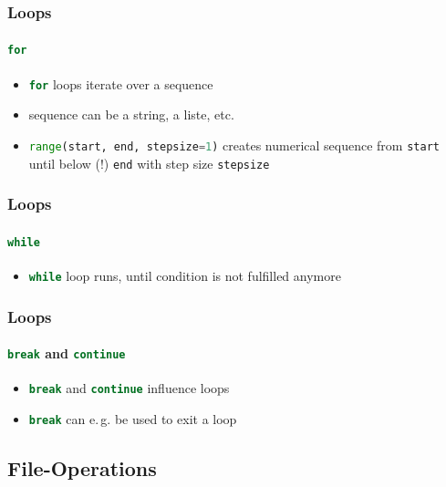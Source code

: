 \documentclass[english]{beamer}
\newcommand{\ta}[1]{\textattachfile[color=1 0 0]{#1}{Code}}
\begin{document}
\begin{frame}[containsverbatim]
\frametitle{Loops}
\framesubtitle{\lstinline[language={Python}]{for}}

\begin{itemize}
\item \lstinline[language={Python}]{for} loops iterate over a sequence
\item sequence can be a string, a liste, etc. 
\item \lstinline[language={Python}]{range(start, end, stepsize=1)} creates numerical sequence from \texttt{start} until below (!) \texttt{end} with step size \texttt{stepsize}
\end{itemize}



\end{frame}


\begin{frame}[containsverbatim]
\frametitle{Loops}
\framesubtitle{\lstinline[language={Python}]{while}}

\begin{itemize}
\item \lstinline[language={Python}]{while} loop runs, until condition is not fulfilled anymore
\end{itemize}



\end{frame}

\begin{frame}[containsverbatim]
\frametitle{Loops}
\framesubtitle{\lstinline[language={Python}]{break} and \lstinline[language={Python}]{continue}}

\begin{itemize}
\item \lstinline[language={Python}]{break} and \lstinline[language={Python}]{continue} influence loops
\item \lstinline[language={Python}]{break} can e.\,g. be used to exit a loop 
\end{itemize}



\end{frame}


\subsection{File-Operations}
\end{document}
